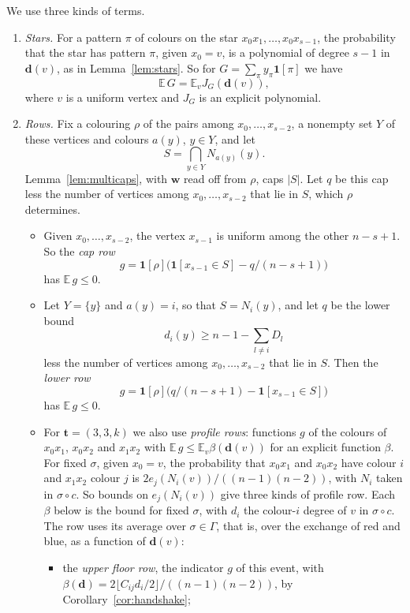 \documentclass[11pt]{article}
\theoremstyle{spacedplain}
\theoremstyle{spaceddef}
\theoremstyle{spacedremark}
\newcommand{\bt}{\mathbf{t}}
\begin{document}
We use three kinds of terms.
\begin{enumerate}[label=(\alph*)]
\item \emph{Stars.}
For a pattern $\pi$ of colours on the star $x_0x_1,\dots,x_0x_{s-1}$, the probability that the star has pattern $\pi$, given $x_0=v$, is a polynomial of degree $s-1$ in $\mathbf d(v)$, as in Lemma~\ref{lem:stars}.
So for $G=\sum_\pi y_\pi\mathbf 1[\pi]$ we have
\[
\mathbb E\,G=\mathbb E_v J_G(\mathbf d(v)),
\]
where $v$ is a uniform vertex and $J_G$ is an explicit polynomial.

\item \emph{Rows.}
Fix a colouring $\rho$ of the pairs among $x_0,\dots,x_{s-2}$, a nonempty set $Y$ of these vertices and colours $a(y)$, $y\in Y$, and let
\[
S=\bigcap_{y\in Y}N_{a(y)}(y).
\]
Lemma~\ref{lem:multicaps}, with $\mathbf w$ read off from $\rho$, caps $|S|$.
Let $q$ be this cap less the number of vertices among $x_0,\dots,x_{s-2}$ that lie in $S$, which $\rho$ determines.
\begin{itemize}
\item Given $x_0,\dots,x_{s-2}$, the vertex $x_{s-1}$ is uniform among the other $n-s+1$.
So the \emph{cap row}
\[
g=\mathbf 1[\rho]\big(\mathbf 1[x_{s-1}\in S]-q/(n-s+1)\big)
\]
has $\mathbb E\,g\le 0$.
\item Let $Y=\{y\}$ and $a(y)=i$, so that $S=N_i(y)$, and let $q$ be the lower bound
\[
d_i(y)\ge n-1-\sum_{l\ne i}D_l
\]
less the number of vertices among $x_0,\dots,x_{s-2}$ that lie in $S$.
Then the \emph{lower row}
\[
g=\mathbf 1[\rho]\big(q/(n-s+1)-\mathbf 1[x_{s-1}\in S]\big)
\]
has $\mathbb E\,g\le 0$.
\item For $\bt=(3,3,k)$ we also use \emph{profile rows}: functions $g$ of the colours of $x_0x_1$, $x_0x_2$ and $x_1x_2$ with $\mathbb E\,g\le\mathbb E_v\beta(\mathbf d(v))$ for an explicit function $\beta$.
For fixed $\sigma$, given $x_0=v$, the probability that $x_0x_1$ and $x_0x_2$ have colour $i$ and $x_1x_2$ colour $j$ is $2e_j(N_i(v))/((n-1)(n-2))$, with $N_i$ taken in $\sigma\circ c$.
So bounds on $e_j(N_i(v))$ give three kinds of profile row.
Each $\beta$ below is the bound for fixed $\sigma$, with $d_i$ the colour-$i$ degree of $v$ in $\sigma\circ c$.
The row uses its average over $\sigma\in\Gamma$, that is, over the exchange of red and blue, as a function of $\mathbf d(v)$:
\begin{itemize}
\item the \emph{upper floor row}, the indicator $g$ of this event, with $\beta(\mathbf d)=2\lfloor C_{ij}d_i/2\rfloor/((n-1)(n-2))$, by Corollary~\ref{cor:handshake};

\end{itemize}
\end{itemize}
\end{enumerate}
\end{document}
